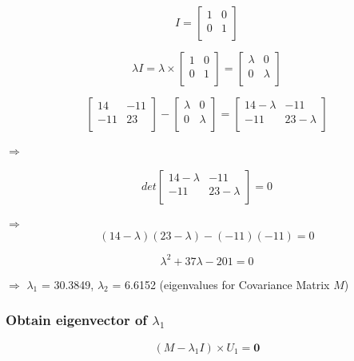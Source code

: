 \documentclass[
  letterpaper,
  DIV=11,
  numbers=noendperiod]{scrreprt}
\begin{document}
\[
I = \begin{bmatrix}
1 & 0 \\
0 & 1 \\
\end{bmatrix}
\]

\[
\lambda I = \lambda \times \begin{bmatrix}
1 & 0 \\
0 & 1 \\
\end{bmatrix} = \begin{bmatrix} 
\lambda  & 0 \\
0 & \lambda  \\
\end{bmatrix}
\]

\[
\begin{bmatrix}
14 & -11 \\
-11&  23 \\
\end{bmatrix} -\begin{bmatrix}
\lambda  & 0 \\
0 & \lambda  \\
\end{bmatrix} = \begin{bmatrix}
14-\lambda  & -11 \\
-11 & 23-\lambda  \\
\end{bmatrix}
\]

\(\Rightarrow\)

\[
det\begin{bmatrix}
 14-\lambda & -11 \\
 -11& 23-\lambda  \\
\end{bmatrix}=0
\]

\(\Rightarrow\) \[(14-\lambda)(23-\lambda) - (-11)(-11) = 0 \]

\[\lambda^2 +37\lambda -201 = 0\]

\(\Rightarrow\) \(\lambda_1\) = 30.3849, \(\lambda_2\) = 6.6152
(eigenvalues for Covariance Matrix \(M\))

\hypertarget{obtain-eigenvector-of-lambda_1}{%
\subsubsection{\texorpdfstring{Obtain eigenvector of
\(\lambda_1\)}{Obtain eigenvector of \textbackslash lambda\_1}}\label{obtain-eigenvector-of-lambda_1}}

\[(M - \lambda_1I)\times U_1 = \mathbf{0} \]
\end{document}
